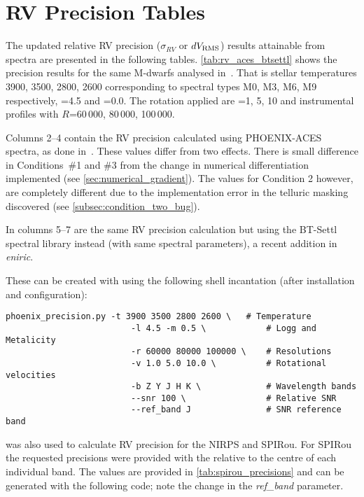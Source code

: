 
\chapter{{RV} Precision Tables} %
\label{appendix:nir_prec_amendment}
The updated relative {RV} precision ($\sigma_{RV}$ or $dV_{\textrm{RMS}}$) results attainable from \nir{} spectra are presented in the following tables.
\cref{tab:rv_aces_btsettl} shows the precision results for the same M-dwarfs analysed in~\citet{figueira_radial_2016}.
That is stellar temperatures 3900, 3500, 2800, 2600\K{} corresponding to spectral types {M0}, {M3}, {M6}, {M9} respectively, \Logg{}=4.5 and \feh{}=0.0.
The rotation applied are \Vsini{}=1, 5, 10\kmps{} and instrumental profiles with \(R\)=60\,000, 80\,000, 100\,000.

Columns 2--4 contain the {RV} precision calculated using {PHOENIX-ACES} spectra, as done in~\citet{figueira_radial_2016}.
These values differ from two effects.
There is small difference in Conditions~\#1 and \#3 from the change in numerical differentiation implemented (see \cref{sec:numerical_gradient}).
The values for Condition 2 however, are completely different due to the implementation error in the telluric masking discovered (see \cref{subsec:condition_two_bug}).

In columns 5--7 are the same {RV} precision calculation but using the {BT-Settl} spectral library instead (with same spectral parameters), a recent addition in \emph{eniric}.

These can be created with \eniric{} using the following shell incantation (after installation and configuration):
\begin{lstlisting}[label={lst:commandline_incantation}]
    phoenix_precision.py -t 3900 3500 2800 2600 \   # Temperature
                         -l 4.5 -m 0.5 \            # Logg and Metalicity
                         -r 60000 80000 100000 \    # Resolutions
                         -v 1.0 5.0 10.0 \          # Rotational velocities
                         -b Z Y J H K \             # Wavelength bands
                         --snr 100 \                # Relative SNR
                         --ref_band J               # SNR reference band
\end{lstlisting}

\Eniric{} was also used to calculate {RV} precision for the {NIRPS} and {SPIRou}.
For {SPIRou} the requested precisions were provided with the \snr{} relative to the centre of each individual band.
The values are provided in \cref{tab:spirou_precisions} and can be generated with the following code; note the change in the \emph{ref\_band} parameter.

